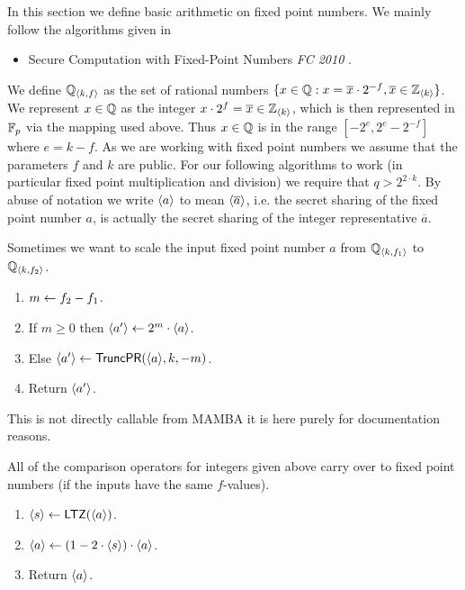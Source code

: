 In this section we define basic arithmetic on fixed
point numbers.
We mainly follow the algorithms given in 
\begin{itemize}
\item Secure Computation with Fixed-Point Numbers {\em FC 2010} \cite{CS10}.
\end{itemize}
We define ${\mathbb{Q}}_{\langle k, f \rangle}$ as the set of rational numbers
$\{x \in {\mathbb{Q}}: x = \overline{x} \cdot 2^{-f}, \overline{x} \in {\mathbb{Z}}_{\langle k \rangle}\}$.
We represent $x \in {\mathbb{Q}}$ as the integer $x \cdot 2^f = \overline{x} \in {\mathbb{Z}}_{\langle k \rangle}$,
which is then represented in ${\mathbb{F}}_p$ via the mapping used above.
Thus $x \in {\mathbb{Q}}$ is in the range $[-2^e,2^e-2^{-f}]$
where $e=k-f$.
As we are working with fixed point numbers we assume that the
parameters $f$ and $k$ are public.
For our following algorithms to work (in particular fixed point
multiplication and division) we require that $q>2^{2 \cdot k}$.
By abuse of notation we write $\langle a \rangle$ to mean $\langle \overline{a} \rangle$,
i.e. the secret sharing of the fixed point number $a$,
is actually the secret sharing of the integer representative
$\overline{a}$.

Sometimes we want to scale the input fixed point number $a$
from ${\mathbb{Q}}_{\langle k, f_1 \rangle}$ to ${\mathbb{Q}}_{\langle k, f_2 \rangle}$.
\begin{enumerate}
\item $m \leftarrow f_2-f_1$.
\item If $m\ge 0$ then $\langle a' \rangle \leftarrow 2^m \cdot \langle a \rangle$.
\item Else $\langle a' \rangle \leftarrow \mathsf{TruncPR}(\langle a \rangle,k,-m)$.
\item Return $\langle a' \rangle$.
\end{enumerate}
This is not directly callable from MAMBA it is here purely
for documentation reasons.

All of the comparison operators for integers given above carry
over to fixed point numbers (if the inputs have the same $f$-values).

\begin{enumerate}
\item $\langle s \rangle \leftarrow \mathsf{LTZ}(\langle a \rangle)$.
\item $\langle a \rangle \leftarrow (1-2\cdot \langle s \rangle) \cdot \langle a \rangle$.
\item Return $\langle a \rangle$.
\end{enumerate}

